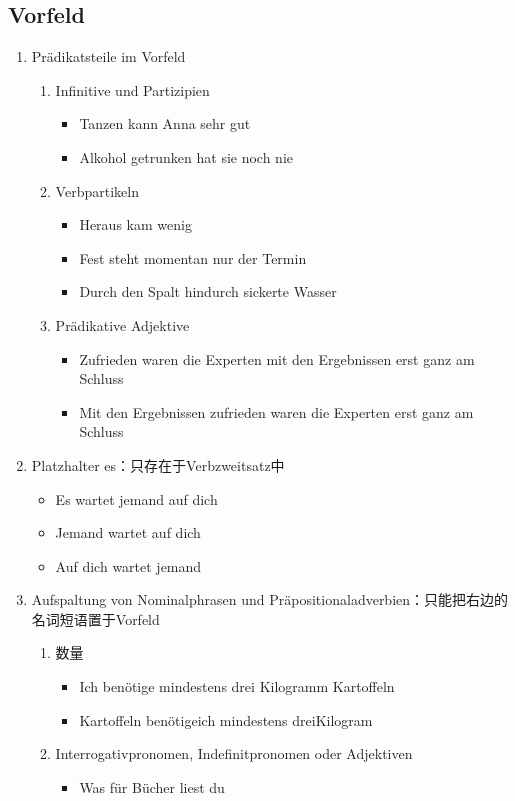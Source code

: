 \documentclass[UTF8]{report}
\begin{document}
\subsection{Vorfeld}
\begin{enumerate}
    \item Prädikatsteile im Vorfeld
    \begin{enumerate}
        \item Infinitive und Partizipien
        \begin{itemize}
            \item Tanzen kann Anna sehr gut
            \item Alkohol getrunken hat sie noch nie
        \end{itemize}
        \item Verbpartikeln
        \begin{itemize}
            \item Heraus kam wenig
            \item Fest steht momentan nur der Termin
            \item Durch den Spalt hindurch sickerte Wasser
        \end{itemize}
        \item Prädikative Adjektive
        \begin{itemize}
            \item Zufrieden waren die Experten mit den Ergebnissen erst ganz am Schluss
            \item Mit den Ergebnissen zufrieden waren die Experten erst ganz am Schluss
        \end{itemize}
    \end{enumerate}
    \item Platzhalter es：只存在于Verbzweitsatz中
    \begin{itemize}
        \item Es wartet jemand auf dich
        \item Jemand wartet auf dich
        \item Auf dich wartet jemand
    \end{itemize}
    \item Aufspaltung von Nominalphrasen und Präpositionaladverbien：只能把右边的名词短语置于Vorfeld
    \begin{enumerate}
        \item 数量
        \begin{itemize}
            \item Ich benötige mindestens drei Kilogramm Kartoffeln
            \item Kartoffeln benötigeich mindestens dreiKilogram
        \end{itemize}
        \item Interrogativpronomen, Indefinitpronomen oder Adjektiven
        \begin{itemize}
            \item Was für Bücher liest du
            

\end{itemize}
\end{enumerate}
\end{enumerate}
\end{document}
